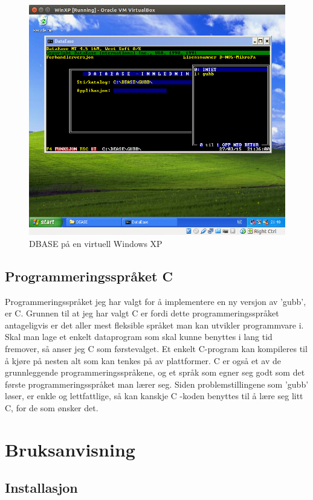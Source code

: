 \documentclass[12pt]{book}
\begin{document}
\begin{figure}
\centering
\includegraphics[width=12.0cm]{bilde_a}
\caption{DBASE på en virtuell Windows XP}
\end{figure}

\section{Programmeringsspråket C}

Programmeringsspråket jeg har valgt for å implementere en ny versjon av 'gubb', er C. Grunnen til at jeg har valgt C er fordi 
dette programmeringsspråket antageligvis er det aller mest fleksible språket man kan utvikler programmvare i. Skal man lage et enkelt dataprogram som skal kunne 
benyttes i lang tid fremover, så anser jeg C som førstevalget. Et enkelt C-program kan kompileres til å kjøre på nesten alt som 
kan tenkes på av plattformer. C er også et av de grunnleggende programmeringsspråkene, og et språk som egner seg godt som det første 
programmeringsspråket man lærer seg. Siden problemstillingene som 'gubb' løser, er enkle og lettfattlige, så kan kanskje C -koden benyttes til å lære seg litt C, for de som ønsker det. 

\chapter{Bruksanvisning}

\section{Installasjon}
\end{document}
